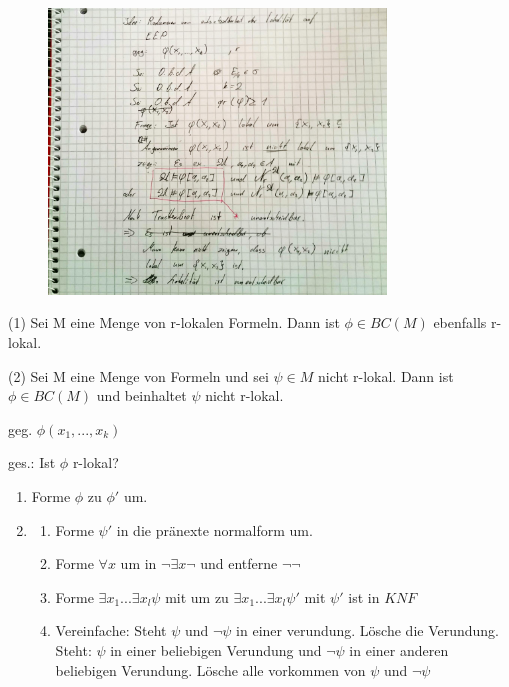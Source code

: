 \documentclass[12pt]{article}
\begin{document}
\begin{figure}[h]
 \centering
 \includegraphics[width=0.8\textwidth]{A3.jpg}
 \caption{}
 \label{}
\end{figure}

(1) Sei M eine Menge von r-lokalen Formeln. Dann ist $\phi\in BC(M)$ ebenfalls r-lokal.

(2) Sei M eine Menge von Formeln und sei $\psi\in M$ nicht r-lokal. Dann ist $\phi\in BC(M)$ und \phi beinhaltet $\psi$ nicht r-lokal.



geg. $\phi(x_1,...,x_k)$

ges.: Ist $\phi$ r-lokal?

\begin{enumerate}
  \item Forme $\phi$ zu $\phi'$ um.
  \item \begin{enumerate}
    \item Forme $\psi'$ in die pränexte normalform um.
    \item Forme $\forall x$ um in $\neg \exists x \neg$ und entferne $\neg \neg$ 
    \item Forme $\exists x_1 ... \exists x_l \psi$ mit um zu 
      $\exists x_1 ... \exists x_l \psi'$ mit $\psi'$ ist in $KNF$
    \item Vereinfache: Steht $\psi$ und $\neg \psi$ in einer verundung. Lösche die Verundung.\\
      Steht: $\psi$ in einer beliebigen Verundung und $\neg \psi$ in einer anderen beliebigen Verundung.
      Lösche alle vorkommen von $\psi$ und $\neg \psi$
  \end{enumerate}
\end{enumerate}
\end{document}
